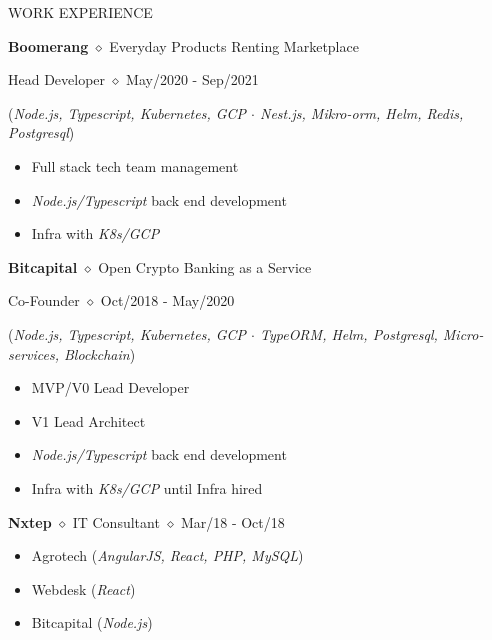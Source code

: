 \documentclass{cv} %
\begin{document}
\begin{rSection}{WORK EXPERIENCE}
\vspace{-1.25em}

\item \textbf{Boomerang} {$\diamond$} Everyday Products Renting Marketplace
\item \hspace{0.25in} {Head Developer} {$\diamond$}  {May/2020 - Sep/2021}
\item \hspace{0.25in} (\textit{{Node.js, Typescript, Kubernetes, GCP} {$\cdot$} {Nest.js, Mikro-orm, Helm, Redis, Postgresql}})
\begin{itemize}
    \itemsep -3pt {} 
    \item Full stack tech team management
    \item \textit{Node.js/Typescript} back end development 
    \item Infra with \textit{K8s/GCP}
\end{itemize}

\medskip

\item \textbf{Bitcapital} {$\diamond$} {Open Crypto Banking as a Service}
\item \hspace{0.25in} {Co-Founder} {$\diamond$} {Oct/2018 - May/2020}
\item \hspace{0.25in} (\textit{{Node.js, Typescript, Kubernetes, GCP} {$\cdot$} {TypeORM, Helm, Postgresql, Micro-services, Blockchain}})
\begin{itemize}
    \itemsep -3pt {} 
    \item MVP/V0 Lead Developer
    \item V1 Lead Architect
    \item \textit{Node.js/Typescript} {back end development}
    \item Infra with \textit{K8s/GCP} until Infra hired
\end{itemize}

\medskip

\item \textbf{Nxtep} {$\diamond$} {IT Consultant} {$\diamond$} {Mar/18 - Oct/18}
\begin{itemize}
    \itemsep -3pt {} 
    \item Agrotech (\textit{AngularJS, React, PHP, MySQL})
    \item Webdesk (\textit{React})
    \item Bitcapital (\textit{Node.js})
\end{itemize}


\end{rSection}
\end{document}
